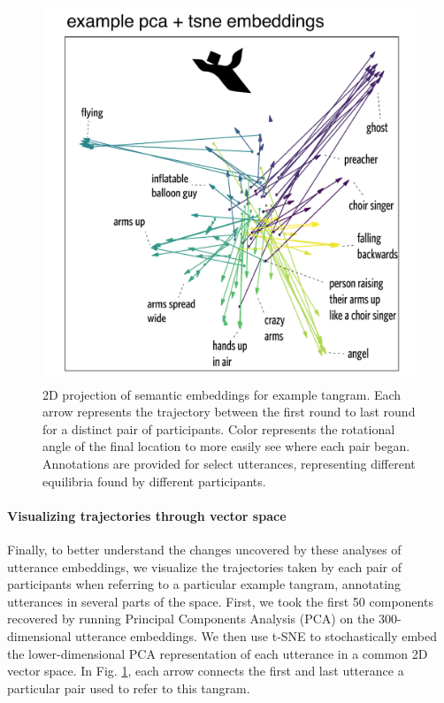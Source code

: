\documentclass[alpha-refs]{wiley-article}
\begin{document}
\begin{figure}[t!]
\centering
\includegraphics[scale=.6]{tsne-tangramC_annotated.pdf}
\caption{2D projection of semantic embeddings for example tangram. Each arrow represents the trajectory between the first round to last round for a distinct pair of participants. Color represents the rotational angle of the final location to more easily see where each pair began. Annotations are provided for select utterances, representing different equilibria found by different participants.}
\label{fig:tsne}
\end{figure}


\paragraph{Visualizing trajectories through vector space}  
Finally, to better understand the changes uncovered by these analyses of utterance embeddings, we visualize the trajectories taken by each pair of participants when referring to a particular example tangram, annotating utterances in several parts of the space.
First, we took the first 50 components recovered by running Principal Components Analysis (PCA) on the 300-dimensional utterance embeddings. 
We then use t-SNE \citep{maaten2008visualizing} to stochastically embed the lower-dimensional PCA representation of each utterance in a common 2D vector space. 
In Fig. \ref{fig:tsne}, each arrow connects the first and last utterance a particular pair used to refer to this tangram.
\end{document}

